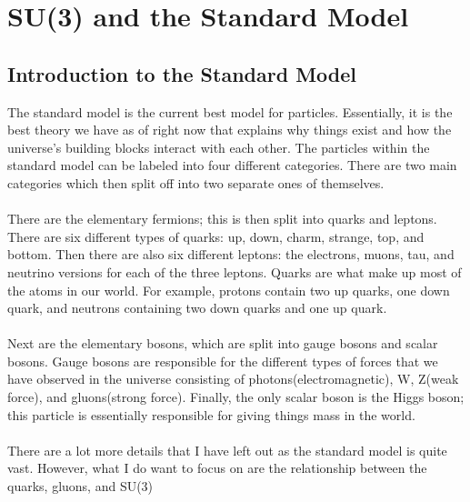 \documentclass[12pt]{article}
\begin{document}
\section{SU(3) and the Standard Model}
\subsection{Introduction to the Standard Model}
The standard model is the current best model for particles. Essentially, it is the best theory we have as of right now that explains why things exist and how the universe's building blocks interact with each other. The particles within the standard model can be labeled into four different categories. There are two main categories which then split off into two separate ones of themselves. \\\\
There are the elementary fermions; this is then split into quarks and leptons. There are six different types of quarks: up, down, charm, strange, top, and bottom. Then there are also six different leptons: the electrons, muons, tau, and neutrino versions for each of the three leptons. Quarks are what make up most of the atoms in our world. For example, protons contain two up quarks, one down quark, and neutrons containing two down quarks and one up quark.\\\\
Next are the elementary bosons, which are split into gauge bosons and scalar bosons. Gauge bosons are responsible for the different types of forces that we have observed in the universe consisting of photons(electromagnetic), W, Z(weak force), and gluons(strong force). Finally, the only scalar boson is the Higgs boson; this particle is essentially responsible for giving things mass in the world.\\\\
There are a lot more details that I have left out as the standard model is quite vast. However, what I do want to focus on are the relationship between the quarks, gluons, and SU(3)
\end{document}

